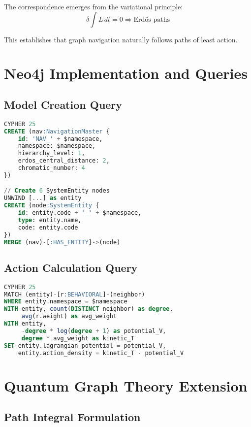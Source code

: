 \documentclass[12pt,a4paper]{article}
\begin{document}
The correspondence emerges from the variational principle:
\begin{equation}
\delta \int L \, dt = 0 \Rightarrow \text{Erdős paths}
\end{equation}

This establishes that graph navigation naturally follows paths of least action.

\section{Neo4j Implementation and Queries}

\subsection{Model Creation Query}

\begin{lstlisting}[language=SQL, caption=Graph creation in Neo4j]
CYPHER 25
CREATE (nav:NavigationMaster {
    id: 'NAV_' + $namespace,
    namespace: $namespace,
    hierarchy_level: 1,
    erdos_central_distance: 2,
    chromatic_number: 4
})

// Create 6 SystemEntity nodes
UNWIND [...] as entity
CREATE (node:SystemEntity {
    id: entity.code + '_' + $namespace,
    type: entity.name,
    code: entity.code
})
MERGE (nav)-[:HAS_ENTITY]->(node)
\end{lstlisting}

\subsection{Action Calculation Query}

\begin{lstlisting}[language=SQL, caption=Computing action values]
CYPHER 25
MATCH (entity)-[r:BEHAVIORAL]-(neighbor)
WHERE entity.namespace = $namespace
WITH entity, count(DISTINCT neighbor) as degree,
     avg(r.weight) as avg_weight
WITH entity, 
     -degree * log(degree + 1) as potential_V,
     degree * avg_weight as kinetic_T
SET entity.lagrangian_potential = potential_V,
    entity.action_density = kinetic_T - potential_V
\end{lstlisting}

\section{Quantum Graph Theory Extension}

\subsection{Path Integral Formulation}
\end{document}
